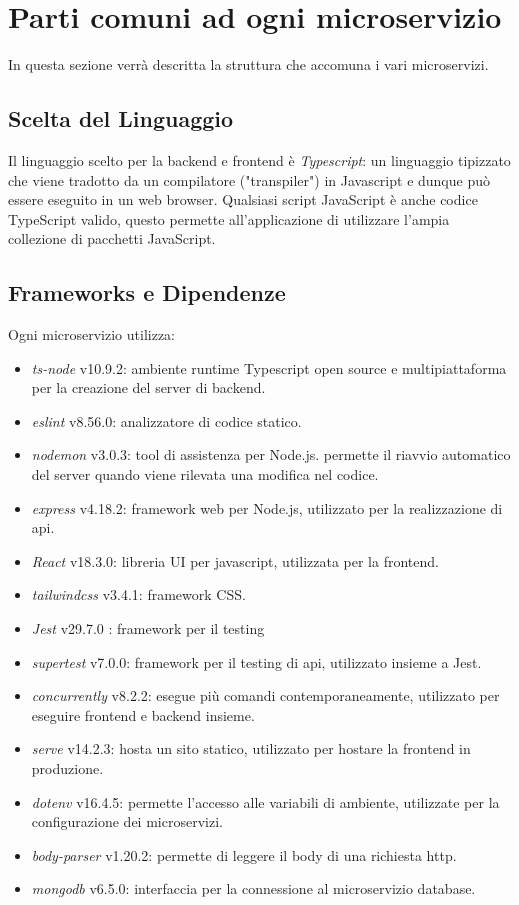 \documentclass{report}
\begin{document}
\section{Parti comuni ad ogni microservizio}

In questa sezione verrà descritta la struttura che accomuna i vari microservizi.

\subsection{Scelta del Linguaggio}

Il linguaggio scelto per la backend e frontend è \textit{Typescript}: un linguaggio tipizzato che viene tradotto da un compilatore ("transpiler") in Javascript e dunque può essere eseguito in un web browser. Qualsiasi script JavaScript è anche codice TypeScript valido, questo permette all'applicazione di utilizzare l'ampia collezione di pacchetti JavaScript.

\subsection{Frameworks e Dipendenze}

Ogni microservizio utilizza:
\begin{itemize}
	\item \textit{ts-node} v10.9.2: ambiente runtime Typescript open source e multipiattaforma per la creazione del server di backend.
	\item \textit{eslint} v8.56.0: analizzatore di codice statico.
	\item \textit{nodemon} v3.0.3: tool di assistenza per Node.js. permette il riavvio automatico del server quando viene rilevata una modifica nel codice.
	\item \textit{express} v4.18.2: framework web per Node.js, utilizzato per la realizzazione di api.
	\item \textit{React} v18.3.0: libreria UI per javascript, utilizzata per la frontend.
	\item \textit{tailwindcss} v3.4.1: framework CSS.
	\item \textit{Jest} v29.7.0 : framework per il testing
	\item \textit{supertest} v7.0.0: framework per il testing di api, utilizzato insieme a Jest.
	\item \textit{concurrently} v8.2.2: esegue più comandi contemporaneamente, utilizzato per eseguire frontend e backend insieme.
	\item \textit{serve} v14.2.3: hosta un sito statico, utilizzato per hostare la frontend in produzione.
	\item \textit{dotenv} v16.4.5: permette l'accesso alle variabili di ambiente, utilizzate per la configurazione dei microservizi.
	\item \textit{body-parser} v1.20.2: permette di leggere il body di una richiesta http.
	\item \textit{mongodb} v6.5.0: interfaccia per la connessione al microservizio database.
\end{itemize}
\end{document}
